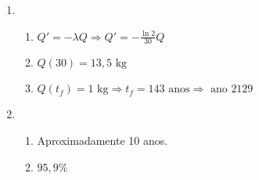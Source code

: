 \documentclass[a4paper]{article}
\begin{document}
\begin{enumerate}
\item 
  \begin{enumerate}
  \item $Q' = -\lambda Q \Rightarrow Q' = -\frac{\ln 2}{30}Q$
  \item $Q(30) = 13,5 \text{ kg}$
  \item $Q(t_f) = 1 \text{ kg}\Rightarrow t_f = 143 \text{ anos} \Rightarrow
    \text{ ano } 2129 $
  \end{enumerate}



\item 
  \begin{enumerate}
  \item Aproximadamente 10 anos.
  \item $95,9\%$
  \end{enumerate}


\end{enumerate}










\end{document}
